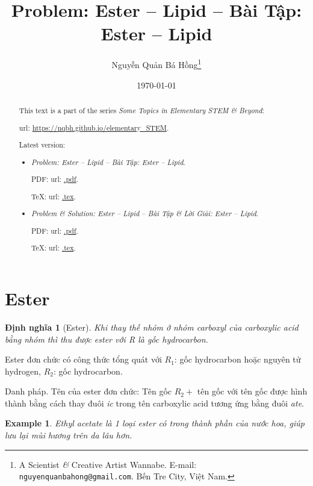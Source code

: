 \documentclass{article}
\title{Problem: Ester -- Lipid -- Bài Tập: Ester -- Lipid}
\author{Nguyễn Quản Bá Hồng\footnote{A Scientist {\it\&} Creative Artist Wannabe. E-mail: {\tt nguyenquanbahong@gmail.com}. Bến Tre City, Việt Nam.}}
\date{\today}
\newtheorem{dinhnghia}{Định nghĩa}
\newtheorem{example}{Example}
\begin{document}
\maketitle
\begin{abstract}
	This text is a part of the series {\it Some Topics in Elementary STEM \& Beyond}:
	
	{\sc url}: \url{https://nqbh.github.io/elementary_STEM}.
	
	Latest version:
	\begin{itemize}
		\item {\it Problem: Ester -- Lipid -- Bài Tập: Ester -- Lipid}.
		
		PDF: {\sc url}: \url{.pdf}.
		
		\TeX: {\sc url}: \url{.tex}.
		\item {\it Problem \& Solution: Ester -- Lipid -- Bài Tập \& Lời Giải: Ester -- Lipid}.
		
		PDF: {\sc url}: \url{.pdf}.
		
		\TeX: {\sc url}: \url{.tex}.
	\end{itemize}
\end{abstract}
\tableofcontents


\section{Ester}

\begin{dinhnghia}[Ester]
	Khi thay thế nhóm  ở nhóm carboxyl  của carboxylic acid bằng nhóm  thì thu được ester với R là gốc hydrocarbon.
\end{dinhnghia}
Ester đơn chức có công thức tổng quát  với $R_1$: gốc hydrocarbon hoặc nguyên tử hydrogen, $R_2$: gốc hydrocarbon.

{\sf Danh pháp.} Tên của ester đơn chức: Tên gốc $R_2 +$ tên gốc  với tên gốc  được hình thành bằng cách thay đuôi {\it ic} trong tên carboxylic acid tương ứng bằng đuôi {\it ate}.

\begin{example}
	\emph{Ethyl acetate} là 1 loại ester có trong thành phần của nước hoa, giúp lưu lại mùi hương trên da lâu hơn.
\end{example}

\end{document}
